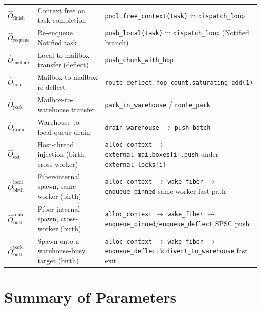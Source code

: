 \documentclass[11pt,a4paper]{report}
\newcommand{\code}[1]{\texttt{#1}}
\begin{document}
\begin{longtable}{>{\ttfamily}p{3.4cm} p{4.5cm} p{5.5cm}}
$\hat{O}_{\text{finish}}$     & Context free on task completion
  & \code{pool.free\_context(task)} in \code{dispatch\_loop} \\
$\hat{O}_{\text{requeue}}$    & Re-enqueue Notified task
  & \code{push\_local(task)} in \code{dispatch\_loop} (Notified branch) \\
$\hat{O}_{\text{mailbox}}$    & Local-to-mailbox transfer (deflect)
  & \code{push\_chunk\_with\_hop} \\
$\hat{O}_{\text{hop}}$        & Mailbox-to-mailbox re-deflect
  & \code{route\_deflect}; \code{hop\_count.saturating\_add(1)} \\
$\hat{O}_{\text{park}}$       & Mailbox-to-warehouse transfer
  & \code{park\_in\_warehouse} / \code{route\_park} \\
$\hat{O}_{\text{drain}}$      & Warehouse-to-local-queue drain
  & \code{drain\_warehouse} $\to$ \code{push\_batch} \\
$\hat{O}_{\text{ext}}$        & Host-thread injection (birth, cross-worker)
  & \code{alloc\_context} $\to$ \code{external\_mailboxes[i].push} under \code{external\_locks[i]} \\
$\hat{O}_{\text{birth}}^{\text{local}}$ & Fiber-internal spawn, same worker (birth)
  & \code{alloc\_context} $\to$ \code{wake\_fiber} $\to$ \code{enqueue\_pinned} same-worker fast path \\
$\hat{O}_{\text{birth}}^{\text{route}}$ & Fiber-internal spawn, cross-worker (birth)
  & \code{alloc\_context} $\to$ \code{wake\_fiber} $\to$ \code{enqueue\_pinned}/\code{enqueue\_deflect} SPSC push \\
$\hat{O}_{\text{birth}}^{\text{park}}$ & Spawn onto a warehouse-busy target (birth)
  & \code{alloc\_context} $\to$ \code{wake\_fiber} $\to$ \code{enqueue\_deflect}'s \code{divert\_to\_warehouse} fast exit \\
\end{longtable}

\newpage

\section{Summary of Parameters}
\end{document}
